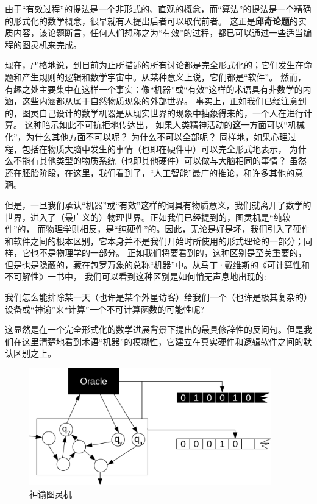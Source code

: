\documentclass[a4paper,12pt]{article}
\begin{document}
由于“有效过程”的提法是一个非形式的、直观的概念，而“算法”的提法是一个精确的形式化的数学概念，很早就有人提出后者可以取代前者。
这正是\textbf{\gls{邱奇论题}}的实质内容\cite{KleeneSC1952}，该论题断言，任何人们想称之为“有效”的过程，都已可以通过一些适当编程的图灵机来完成。

现在，严格地说，到目前为止所描述的所有讨论都是完全形式化的；它们发生在\gls{命题}和\gls{产生规则}的逻辑和数学宇宙中。从某种意义上说，它们都是“\gls{软件}”。
然而，有趣之处主要集中在这样一个事实：像“机器”或“有效”这样的术语具有非数学的内涵，这些内涵都从属于自然\gls{物质现象}的外部世界。
事实上，正如我们已经注意到的，图灵自己设计的数学机器是从现实世界的现象中抽象得来的，一个人在进行计算。
这种暗示如此不可抗拒地传达出， 如果人类精神活动的\textbf{这一}方面可以“机械化”，为什么其他方面不可以呢？ 为什么不可以全部呢？
同样地，如果心理过程，包括在物质大脑中发生的事情（也即在\gls{硬件}中）可以完全形式地表示，
为什么不能有其他类型的\gls{物质系统}（也即其他硬件）可以做与大脑相同的事情？
虽然还在胚胎阶段，在这里，我们看到了，“\gls{人工智能}”最广的推论，和许多其他的意涵。

但是，一旦我们承认“机器”或“有效”这样的词具有物质意义，我们就离开了数学的世界，进入了（最广义的）物理世界。正如我们已经提到的，图灵机是“纯软件”的，
而物理学则相反，是“纯硬件”的。因此，无论是好是坏，我们引入了硬件和软件之间的根本区别，它本身并不是我们开始时所使用的\gls{形式理论}的一部分；同样，它也不是物理学的一部分。
正如我们将要看到的，这种区别是至关重要的，但是也是隐蔽的，藏在包罗万象的总称“机器”中。从马丁·戴维斯的《可计算性和不可解性》\cite{DavisM1958}一书中，
我们可以看到这种区别是如何悄无声息地出现的:

\begin{displayquote}
    我们怎么能排除某一天（也许是某个外星访客）给我们一个（也许是极其复杂的）设备或“\gls{神谕}”来“计算”一个\gls{不可计算}函数的可能性呢?
\end{displayquote}

这显然是在一个完全形式化的数学进展背景下提出的最具修辞性的反问句。但是我们在这里清楚地看到术语“机器”的模糊性，它建立在真实硬件和逻辑软件之间的默认区别之上。

\begin{figure}[ht]
\centering
\includegraphics[height=2.0in]{images/turing_machine_oracle.png}
\caption{神谕图灵机}
\end{figure}
\end{document}
